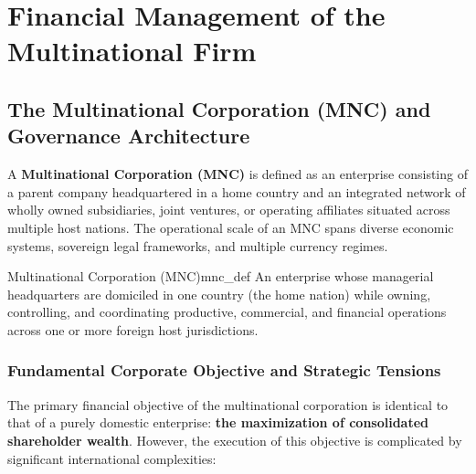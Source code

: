 \chapter{Financial Management of the Multinational Firm}
\label{ch:multinational_financial_management}

\section{The Multinational Corporation (MNC) and Governance Architecture}
\label{sec:mnc_governance_architecture}

A \textbf{Multinational Corporation (MNC)} is defined as an enterprise consisting of a parent company headquartered in a home country and an integrated network of wholly owned subsidiaries, joint ventures, or operating affiliates situated across multiple host nations. The operational scale of an MNC spans diverse economic systems, sovereign legal frameworks, and multiple currency regimes.

\begin{definition}{Multinational Corporation (MNC)}{mnc_def}
An enterprise whose managerial headquarters are domiciled in one country (the home nation) while owning, controlling, and coordinating productive, commercial, and financial operations across one or more foreign host jurisdictions.
\end{definition}

\vspace{0.3em}

\subsection{Fundamental Corporate Objective and Strategic Tensions}
The primary financial objective of the multinational corporation is identical to that of a purely domestic enterprise: \textbf{the maximization of consolidated shareholder wealth}. However, the execution of this objective is complicated by significant international complexities:

